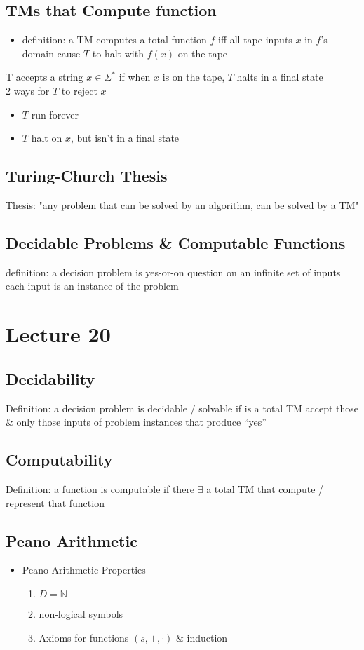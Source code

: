 \documentclass[11pt]{article}
\newcommand{\N}{{\mathbb{N}}}
\begin{document}
\subsection{TMs that Compute function}
\begin{itemize}
    \item definition: a TM computes a total function $f$ iff all tape inputs $x$ in $f$'s domain cause $T$ to halt with $f(x)$ on the tape 
\end{itemize}
T accepts a string $x\in\Sigma^*$ if when $x$ is on the tape, $T$ halts in a final state \\
2 ways for $T$ to reject $x$
\begin{itemize}
    \item $T$ run forever 
    \item $T$ halt on $x$, but isn't in a final state 
\end{itemize}
\subsection{Turing-Church Thesis}
Thesis: "any problem that can be solved by an algorithm, can be solved by a TM"
\subsection{Decidable Problems \& Computable Functions}
definition: a decision problem is yes-or-on question on an infinite set of inputs \\
each input is an instance of the problem 

\section{Lecture 20}
\subsection{Decidability}
Definition: a decision problem is decidable / solvable if is a total TM accept those \& only those inputs of problem instances that produce ``yes''
\subsection{Computability}
Definition: a function is computable if there $\exists$ a total TM that compute / represent that function 
\subsection{Peano Arithmetic}
\begin{itemize}
    \item Peano Arithmetic Properties
    \begin{enumerate}
        \item $D=\N$
        \item non-logical symbols 
        \item Axioms for functions $(s,+,\cdot)$ \& induction 
    \end{enumerate}
\end{itemize}
\end{document}
